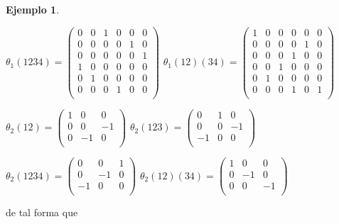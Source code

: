 \documentclass[12pt]{book}
\theoremstyle{definition}
\newtheorem{example}[theorem]{Ejemplo}
\newcounter{in}
\begin{document}
\begin{example}
\begin{center}
  $\theta_{1}(1234)= \left(
    \begin{array}{rrrrrr}
      0 & 0 & 1 & 0 & 0 & 0\\
      0 & 0 & 0 & 0 & 1 & 0\\
      0 & 0 & 0 & 0 & 0 & 1\\
      1 & 0 & 0 & 0 & 0 & 0\\
      0 & 1 & 0 & 0 & 0 & 0\\
      0 & 0 & 0 & 1 & 0 & 0\\
    \end{array} 
  \right)$ \quad
  $\theta_{1}(12)(34)= \left(
    \begin{array}{rrrrrr}
      1 & 0 & 0 & 0 & 0 & 0\\
      0 & 0 & 0 & 0 & 1 & 0\\
      0 & 0 & 0 & 1 & 0 & 0\\
      0 & 0 & 1 & 0 & 0 & 0\\
      0 & 1 & 0 & 0 & 0 & 0\\
      0 & 0 & 0 & 1 & 0 & 1\\
    \end{array} 
  \right)$ 
\end{center}

\begin{center}
  $\theta_{2}(12)= \left(
    \begin{array}{rrr}
      1 & 0 & 0 \\
      0 & 0 & -1 \\
      0 & -1 & 0 \\
    \end{array} 
  \right)$ \quad
  $\theta_{2}(123)= \left(
    \begin{array}{rrr}
      0 & 1 & 0 \\
      0 & 0 & -1 \\
      -1 & 0 & 0 \\
    \end{array} 
  \right)$
\end{center}

\begin{center}
  $\theta_{2}(1234)= \left(
    \begin{array}{rrr}
      0 & 0 & 1 \\
      0 & -1 & 0 \\
      -1 & 0 & 0 \\
    \end{array} 
  \right)$ \quad
  $\theta_{2}(12)(34)= \left(
    \begin{array}{rrr}
      1 & 0 & 0 \\
      0 & -1& 0 \\
      0 & 0 & -1 \\
    \end{array} 
  \right)$
\end{center}
de tal forma que


\end{example}
\end{document}
